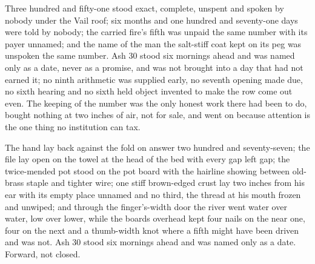 Three hundred and fifty-one stood exact, complete, unspent and spoken by nobody under the Vail roof; six months and one hundred and seventy-one days were told by nobody; the carried fire's fifth was unpaid the same number with its payer unnamed; and the name of the man the salt-stiff coat kept on its peg was unspoken the same number. Ash 30 stood six mornings ahead and was named only as a date, never as a promise, and was not brought into a day that had not earned it; no ninth arithmetic was supplied early, no seventh opening made due, no sixth hearing and no sixth held object invented to make the row come out even. The keeping of the number was the only honest work there had been to do, bought nothing at two inches of air, not for sale, and went on because attention is the one thing no institution can tax.

The hand lay back against the fold on answer two hundred and seventy-seven; the file lay open on the towel at the head of the bed with every gap left gap; the twice-mended pot stood on the pot board with the hairline showing between old-brass staple and tighter wire; one stiff brown-edged crust lay two inches from his ear with its empty place unnamed and no third, the thread at his mouth frozen and unwiped; and through the finger's-width door the river went water over water, low over lower, while the boards overhead kept four nails on the near one, four on the next and a thumb-width knot where a fifth might have been driven and was not. Ash 30 stood six mornings ahead and was named only as a date. Forward, not closed.
